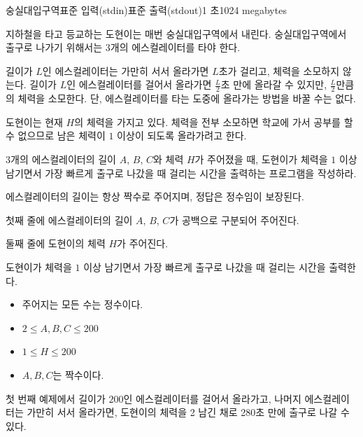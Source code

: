\def\probtitle{숭실대입구역}
\def\probno{B} %

\begin{problem}{\probtitle}{표준 입력(stdin)}{표준 출력(stdout)}{1 초}{1024 megabytes}

지하철을 타고 등교하는 도현이는 매번 숭실대입구역에서 내린다. 숭실대입구역에서 출구로 나가기 위해서는 3개의 에스컬레이터를 타야 한다.

길이가 $L$인 에스컬레이터는 가만히 서서 올라가면 $L$초가 걸리고, 체력을 소모하지 않는다. 길이가 $L$인 에스컬레이터를 걸어서 올라가면 $\frac{L}{2}$초 만에 올라갈 수 있지만, $\frac{L}{2}$만큼의 체력을 소모한다. 단, 에스컬레이터를 타는 도중에 올라가는 방법을 바꿀 수는 없다.

도현이는 현재 $H$의 체력을 가지고 있다. 체력을 전부 소모하면 학교에 가서 공부를 할 수 없으므로 남은 체력이 $1$ 이상이 되도록 올라가려고 한다.

3개의 에스컬레이터의 길이 $A$, $B$, $C$와 체력 $H$가 주어졌을 때, 도현이가 체력을 $1$ 이상 남기면서 가장 빠르게 출구로 나갔을 때 걸리는 시간을 출력하는 프로그램을 작성하라.

에스컬레이터의 길이는 항상 짝수로 주어지며, 정답은 정수임이 보장된다.

\InputFile

첫째 줄에 에스컬레이터의 길이 $A$, $B$, $C$가 공백으로 구분되어 주어진다.

둘째 줄에 도현이의 체력 $H$가 주어진다.

\OutputFile

도현이가 체력을 $1$ 이상 남기면서 가장 빠르게 출구로 나갔을 때 걸리는 시간을 출력한다.

\Constraints

\begin{itemize}[topsep=0pt,noitemsep]
    \item 주어지는 모든 수는 정수이다.
    \item $2 \le A, B,C \le 200$
    \item $1 \le H \le 200$
    \item $A,B,C$는 짝수이다.
\end{itemize}

\Example

\begin{example}
\end{example}

\Notes

첫 번째 예제에서 길이가 $200$인 에스컬레이터를 걸어서 올라가고, 나머지 에스컬레이터는 가만히 서서 올라가면, 도현이의 체력을 2 남긴 채로 280초 만에 출구로 나갈 수 있다.

\end{problem}
